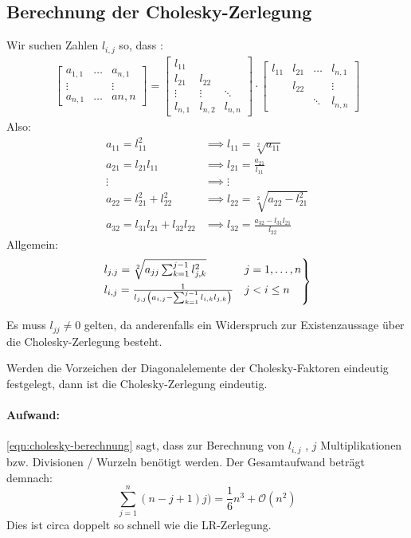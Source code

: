 \subsection{Berechnung der Cholesky-Zerlegung}
Wir suchen Zahlen $l_{i,j}$ so, dass :
\begin{align*}
\begin{bmatrix}
	a_{1,1} & \ldots & a_{n,1} \\
	\vdots & & \vdots \\
	a_{n,1} & \ldots & a{n,n}
\end{bmatrix} = \begin{bmatrix}
l_{11} \\
	l_{21} & l_{22} \\
	\vdots & \vdots & \ddots \\	
	l_{n,1} & l_{n,2} & l_{n,n}
\end{bmatrix} \cdot \begin{bmatrix}
	l_{11} & l_{21}& \ldots & l_{n,1} \\
	       &l_{22} &  & \vdots \\
	        & & \ddots  & l_{n,n}
\end{bmatrix}
\end{align*}
Also: 
\begin{align*}
	a_{11}=l_{11}^2 &\implies l_{11}=\sqrt[2]{a_{11}} \\
	a_{21}= l_{21}l_{11} &\implies l_{21}= \frac{a_{21}}{l_{11}} \\
	\vdots &\implies \vdots \\
	a_{22}= l_{21}^2 +l_{22}^2 &\implies l_{22}= \sqrt[2]{a_{22}-l_{21}^2} \\
	a_{32}= l_{31}l_{21}+l_{32}l_{22} &\implies l_{32}= \frac{a_{32}-l_{31}l_{21}}{l_{22}}
\end{align*}
Allgemein:
\begin{equation}
	\label{eqn:cholesky-berechnung}
\begin{rcases}
	l_{j,j} = \sqrt[2]{a_{jj} \sum_{k=1}^{j-1}l_{j,k}^2} & j=1,\ldots,n \\
	l_{i,j} = \frac{1}{l_{j,j}\left( a_{i,j} -\sum_{k=1}^{j-1}l_{i,k} l_{j,k} \right)} & j<i\le n
\end{rcases}
\end{equation}
\begin{remark}
Es muss $l_{jj} \neq 0$ gelten, da anderenfalls ein Widerspruch zur Existenzaussage über die Cholesky-Zerlegung besteht.
\end{remark}
\begin{corollary}
	Werden die Vorzeichen der Diagonalelemente der Cholesky-Faktoren eindeutig festgelegt, dann ist die Cholesky-Zerlegung eindeutig.
\end{corollary}
\paragraph{Aufwand:} \eqref{eqn:cholesky-berechnung} sagt, dass zur Berechnung von $l_{i,j}$ , $j$ Multiplikationen bzw. Divisionen / Wurzeln benötigt werden.
Der Gesamtaufwand beträgt demnach: 
\[
\sum_{j=1}^{n}(n-j+1)j) = \frac{1}{6}n^3+\mathcal{O}(n^2)
\]
Dies ist circa doppelt so schnell wie die LR-Zerlegung.
